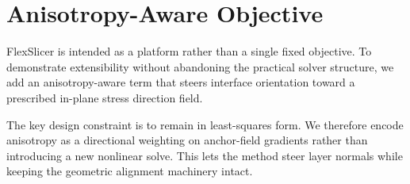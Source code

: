 \section{Anisotropy-Aware Objective}

FlexSlicer is intended as a platform rather than a single fixed objective. To demonstrate extensibility without abandoning the practical solver structure, we add an anisotropy-aware term that steers interface orientation toward a prescribed in-plane stress direction field.

The key design constraint is to remain in least-squares form. We therefore encode anisotropy as a directional weighting on anchor-field gradients rather than introducing a new nonlinear solve. This lets the method steer layer normals while keeping the geometric alignment machinery intact.
